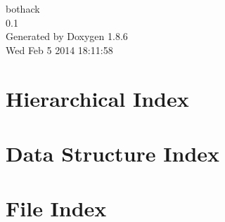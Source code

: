 \documentclass[twoside]{book}
\newcommand{\+}{\discretionary{\mbox{\scriptsize$\hookleftarrow$}}{}{}}
\newcommand{\clearemptydoublepage}{%
  \newpage{\pagestyle{empty}\cleardoublepage}%
}
\begin{document}
\hypersetup{pageanchor=false,
             bookmarks=true,
             bookmarksnumbered=true,
             pdfencoding=unicode
            }
\begin{titlepage}
\vspace*{7cm}
\begin{center}%
{\Large bothack \\[1ex]\large 0.\+1 }\\
\vspace*{1cm}
{\large Generated by Doxygen 1.8.6}\\
\vspace*{0.5cm}
{\small Wed Feb 5 2014 18:11:58}\\
\end{center}
\end{titlepage}
\clearemptydoublepage
\tableofcontents
\clearemptydoublepage
{}
\hypersetup{pageanchor=true}

\chapter{Hierarchical Index}

\chapter{Data Structure Index}

\chapter{File Index}

\end{document}

